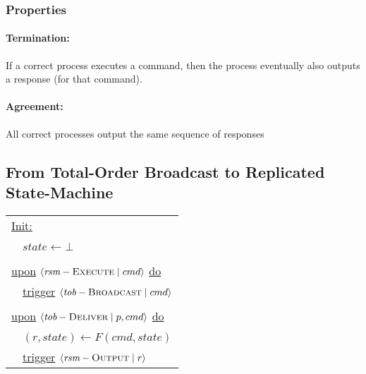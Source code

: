 \documentclass{article}
\begin{document}
\begin{adjustwidth}{2em}{2em}
\begin{adjustwidth}{2em}{2em}
			\subsubsection{Properties}
			\begin{adjustwidth}{2em}{}
				\hfill \vspace{-1cm}
				\paragraph{Termination:}
				\begin{adjustwidth}{1em}{}
					If a correct process executes a command, then the process eventually also outputs a response (for that command).
				\end{adjustwidth}
				\paragraph{Agreement:}
				\begin{adjustwidth}{1em}{}
					All correct processes output the same sequence of responses
				\end{adjustwidth}
			\end{adjustwidth}
		\end{adjustwidth}
		\subsection{From Total-Order Broadcast to Replicated State-Machine}
		\begin{adjustwidth}{2em}{2em}
			\begin{center}
				\begin{tabular}{l}
					\underline{Init:} \\
					\ \ $\textit{state} \leftarrow \bot$ \\
					\\
					\underline{upon} $\langle \textit{rsm}-\textsc{Execute} \mid cmd \rangle$ \underline{do} \\
					\ \ \underline{trigger} $\langle \textit{tob}-\textsc{Broadcast} \mid cmd \rangle$ \\
					\\
					\underline{upon} $\langle \textit{tob}-\textsc{Deliver} \mid p, cmd \rangle$ \underline{do} \\
					\ \ $(r, \textit{state}) \leftarrow F(cmd, \textit{state})$ \\
					\ \ \underline{trigger} $\langle \textit{rsm}-\textsc{Output} \mid r \rangle$
				\end{tabular}
			\end{center}
		\end{adjustwidth}
	\end{adjustwidth}
	
\end{document}
